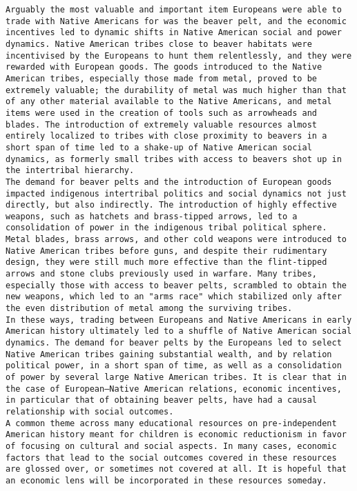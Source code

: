 \documentclass[letterpaper]{article}
\begin{document}
\begin{verbatim}
Arguably the most valuable and important item Europeans were able to trade with Native Americans for was the beaver pelt, and the economic incentives led to dynamic shifts in Native American social and power dynamics. Native American tribes close to beaver habitats were incentivised by the Europeans to hunt them relentlessly, and they were rewarded with European goods. The goods introduced to the Native American tribes, especially those made from metal, proved to be extremely valuable; the durability of metal was much higher than that of any other material available to the Native Americans, and metal items were used in the creation of tools such as arrowheads and blades. The introduction of extremely valuable resources almost entirely localized to tribes with close proximity to beavers in a short span of time led to a shake-up of Native American social dynamics, as formerly small tribes with access to beavers shot up in the intertribal hierarchy.
The demand for beaver pelts and the introduction of European goods impacted indigenous intertribal politics and social dynamics not just directly, but also indirectly. The introduction of highly effective weapons, such as hatchets and brass-tipped arrows, led to a consolidation of power in the indigenous tribal political sphere. Metal blades, brass arrows, and other cold weapons were introduced to Native American tribes before guns, and despite their rudimentary design, they were still much more effective than the flint-tipped arrows and stone clubs previously used in warfare. Many tribes, especially those with access to beaver pelts, scrambled to obtain the new weapons, which led to an "arms race" which stabilized only after the even distribution of metal among the surviving tribes.
In these ways, trading between Europeans and Native Americans in early American history ultimately led to a shuffle of Native American social dynamics. The demand for beaver pelts by the Europeans led to select Native American tribes gaining substantial wealth, and by relation political power, in a short span of time, as well as a consolidation of power by several large Native American tribes. It is clear that in the case of European—Native American relations, economic incentives, in particular that of obtaining beaver pelts, have had a causal relationship with social outcomes.
A common theme across many educational resources on pre-independent American history meant for children is economic reductionism in favor of focusing on cultural and social aspects. In many cases, economic factors that lead to the social outcomes covered in these resources are glossed over, or sometimes not covered at all. It is hopeful that an economic lens will be incorporated in these resources someday.
\end{verbatim}
\end{document}

